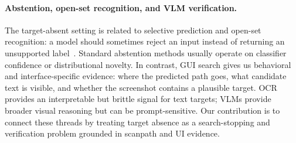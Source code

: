 \paragraph{Abstention, open-set recognition, and VLM verification.}
The target-absent setting is related to selective prediction and open-set recognition: a model should sometimes reject an input instead of returning an unsupported label~\cite{geifman2017selective,scheirer2013openset}. Standard abstention methods usually operate on classifier confidence or distributional novelty. In contrast, GUI search gives us behavioral and interface-specific evidence: where the predicted path goes, what candidate text is visible, and whether the screenshot contains a plausible target. OCR provides an interpretable but brittle signal for text targets; VLMs provide broader visual reasoning but can be prompt-sensitive. Our contribution is to connect these threads by treating target absence as a search-stopping and verification problem grounded in scanpath and UI evidence.
